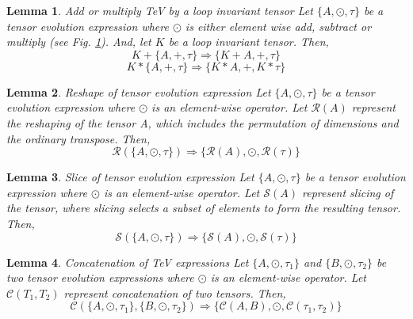 \documentclass{article}
\newtheorem{lemma}{Lemma}
\begin{document}
    \iffalse
    \begin{figure}[h!]
    \centering
      \texttt{[image: images/evol\_add\_basic.png]}
      \caption{Adding a loop invariant tensor `K' to a TeV expression}
    \end{figure}
    \fi

    \begin{lemma}{Add or multiply TeV by a loop invariant tensor}
    \label{lem::evol_add_basic}
    \newline Let $\{A,\odot,\tau\}$ be a tensor evolution expression where $\odot$ is either element wise add, subtract or multiply (see Fig. \ref{lem::evol_add_basic}).
    And, let $K$ be a loop invariant tensor. Then, 
    \[
    K+\{A, +, \tau \} \Rightarrow \{K+A, +, \tau \}
    \]
    \[
    K *\{A,+,\tau\} \Rightarrow \{K*A,+,K*\tau \}
    \]
    \end{lemma}
    
    
    \begin{lemma}{Reshape of tensor evolution expression}
    \label{lem::Reshape}
    \newline Let $\{A,\odot,\tau\}$ be a tensor evolution expression where $\odot$ is an element-wise operator.
    Let $\mathcal{R}(A)$ represent the reshaping of the tensor 
    A, which includes the permutation of dimensions and the ordinary transpose.
    Then,
    \[
     \mathcal{R}(\{A, \odot, \tau \}) 
     \Rightarrow
     \{\mathcal{R}(A), \odot, \mathcal{R}(\tau)\}
    \]
    \end{lemma}
    
    
    
    \begin{lemma}{Slice of tensor evolution expression}
    \label{lem::Slice}
    \newline Let $\{A,\odot,\tau\}$ be a tensor evolution expression where $\odot$ is an element-wise operator.
    Let $\mathcal{S}(A)$ represent slicing of the tensor, where slicing selects a subset of elements to form the resulting tensor.
    Then,
    \[
     \mathcal{S}(\{A, \odot, \tau \}) 
     \Rightarrow 
     \{\mathcal{S}(A), \odot, \mathcal{S}(\tau)\}
    \]
    \end{lemma}
    
    
    \begin{lemma}{Concatenation of TeV expressions}
    \label{lem::Concat}
    \newline Let $\{A,\odot,\tau_1\}$ and $\{B,\odot,\tau_2\}$ be two tensor evolution expressions
    where $\odot$ is an element-wise operator.
    Let $\mathcal{C}(T_1,T_2)$ represent concatenation of two tensors.
    Then,
    \[
     \mathcal{C}(\{A,\odot,\tau_1\}, \{B,\odot,\tau_2\})
     \Rightarrow 
     \{\mathcal{C}(A,B),\odot,\mathcal{C}(\tau_1,\tau_2)\} 
    \]
    \end{lemma}
    
\end{document}

